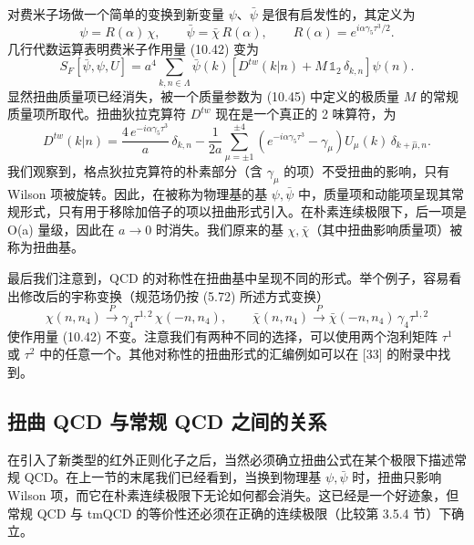 对费米子场做一个简单的变换到新变量 $\psi$、$\bar\psi$ 是很有启发性的，其定义为
\begin{equation}
  \psi = R(\alpha)\,\chi , \qquad \bar\psi = \bar\chi\, R(\alpha) , \qquad
  R(\alpha) = e^{i\alpha\gamma_5\tau^3/2} .
\end{equation}
几行代数运算表明费米子作用量 (10.42) 变为
\begin{equation}
  S_F[\bar\psi, \psi, U] = a^4 \sum_{k,n\in\Lambda}
  \bar\psi(k)\left[D^{tw}(k|n) + M\,\mathbb{1}_2\,\delta_{k,n}\right]\psi(n) .
\end{equation}
显然扭曲质量项已经消失，被一个质量参数为 (10.45) 中定义的极质量 $M$ 的常规质量项所取代。扭曲狄拉克算符 $D^{tw}$ 现在是一个真正的 2 味算符，为
\begin{equation}
  D^{tw}(k|n) = \frac{4\,e^{-i\alpha\gamma_5\tau^3}}{a}\,\delta_{k,n}
  - \frac{1}{2a}\sum_{\mu=\pm1}^{\pm4}
  \left(e^{-i\alpha\gamma_5\tau^3} - \gamma_\mu\right)
  U_\mu(k)\, \delta_{k+\hat\mu,n} .
\end{equation}
我们观察到，格点狄拉克算符的朴素部分（含 $\gamma_\mu$ 的项）不受扭曲的影响，只有 Wilson 项被旋转。因此，在被称为物理基的基 $\psi, \bar\psi$ 中，质量项和动能项呈现其常规形式，只有用于移除加倍子的项以扭曲形式引入。在朴素连续极限下，后一项是 O(a) 量级，因此在 $a \to 0$ 时消失。我们原来的基 $\chi, \bar\chi$（其中扭曲影响质量项）被称为扭曲基。

最后我们注意到，QCD 的对称性在扭曲基中呈现不同的形式。举个例子，容易看出修改后的宇称变换（规范场仍按 (5.72) 所述方式变换）
\begin{equation}
  \chi(n, n_4) \xrightarrow{P} \gamma_4\tau^{1,2}\,\chi(-n, n_4) , \qquad
  \bar\chi(n, n_4) \xrightarrow{P} \bar\chi(-n, n_4)\,\gamma_4\tau^{1,2}
\end{equation}
使作用量 (10.42) 不变。注意我们有两种不同的选择，可以使用两个泡利矩阵 $\tau^1$ 或 $\tau^2$ 中的任意一个。其他对称性的扭曲形式的汇编例如可以在 [33] 的附录中找到。

\subsection{扭曲 QCD 与常规 QCD 之间的关系}

在引入了新类型的红外正则化子之后，当然必须确立扭曲公式在某个极限下描述常规 QCD。在上一节的末尾我们已经看到，当换到物理基 $\psi, \bar\psi$ 时，扭曲只影响 Wilson 项，而它在朴素连续极限下无论如何都会消失。这已经是一个好迹象，但常规 QCD 与 tmQCD 的等价性还必须在正确的连续极限（比较第 3.5.4 节）下确立。

